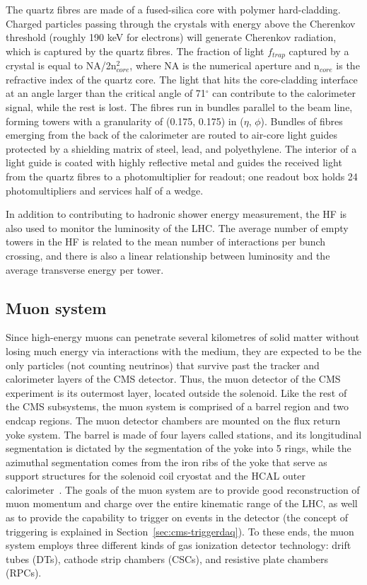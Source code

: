 The quartz fibres are made of a fused-silica core with polymer hard-cladding. Charged particles passing through the crystals with energy above the Cherenkov threshold (roughly 190 keV for electrons) will generate Cherenkov radiation, which is captured by the quartz fibres. The fraction of light $f_{trap}$ captured by a crystal is equal to NA/2n$_{core}^2$, where NA is the numerical aperture and n$_{core}$ is the refractive index of the quartz core. The light that hits the core-cladding interface at an angle larger than the critical angle of 71$^{\circ}$ can contribute to the calorimeter signal, while the rest is lost. The fibres run in bundles parallel to the beam line, forming towers with a granularity of (0.175, 0.175) in ($\eta$, $\phi$). Bundles of fibres emerging from the back of the calorimeter are routed to air-core light guides protected by a shielding matrix of steel, lead, and polyethylene. The interior of a light guide is coated with highly reflective metal and guides the received light from the quartz fibres to a photomultiplier for readout; one readout box holds 24 photomultipliers and services half of a wedge.

In addition to contributing to hadronic shower energy measurement, the HF is also used to monitor the luminosity of the LHC. The average number of empty towers in the HF is related to the mean number of interactions per bunch crossing, and there is also a linear relationship between luminosity and the average transverse energy per tower.

\subsection{Muon system\label{sec:cms-muon}}
Since high-energy muons can penetrate several kilometres of solid matter without losing much energy via interactions with the medium, they are expected to be the only particles (not counting neutrinos) that survive past the tracker and calorimeter layers of the CMS detector. Thus, the muon detector of the CMS experiment is its outermost layer, located outside the solenoid. Like the rest of the CMS subsystems, the muon system is comprised of a barrel region and two endcap regions. The muon detector chambers are mounted on the flux return yoke system. The barrel is made of four layers called stations, and its longitudinal segmentation is dictated by the segmentation of the yoke into 5 rings, while the azimuthal segmentation comes from the iron ribs of the yoke that serve as support structures for the solenoid coil cryostat and the HCAL outer calorimeter~\cite{MuonTDR}. The goals of the muon system are to provide good reconstruction of muon momentum and charge over the entire kinematic range of the LHC, as well as to provide the capability to trigger on events in the detector (the concept of triggering is explained in Section~\ref{sec:cms-triggerdaq}). To these ends, the muon system employs three different kinds of gas ionization detector technology: drift tubes (DTs), cathode strip chambers (CSCs), and resistive plate chambers (RPCs).

